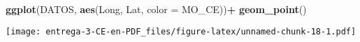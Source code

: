 \documentclass[
]{article}
\newenvironment{Shaded}{\begin{snugshade}}{\end{snugshade}}
\newcommand{\DataTypeTok}[1]{\textcolor[rgb]{0.13,0.29,0.53}{#1}}
\newcommand{\DecValTok}[1]{\textcolor[rgb]{0.00,0.00,0.81}{#1}}
\newcommand{\KeywordTok}[1]{\textcolor[rgb]{0.13,0.29,0.53}{\textbf{#1}}}
\newcommand{\NormalTok}[1]{#1}
\newcommand{\OperatorTok}[1]{\textcolor[rgb]{0.81,0.36,0.00}{\textbf{#1}}}
\newcommand{\StringTok}[1]{\textcolor[rgb]{0.31,0.60,0.02}{#1}}
\begin{document}
\begin{Shaded}
\begin{Highlighting}[]
\KeywordTok{ggplot}\NormalTok{(DATOS, }\KeywordTok{aes}\NormalTok{(Long, Lat, }\DataTypeTok{color =}\NormalTok{ MO_CE))}\OperatorTok{+}
\StringTok{  }\KeywordTok{geom_point}\NormalTok{()}
\end{Highlighting}
\end{Shaded}

\texttt{[image: entrega-3-CE-en-PDF\_files/figure-latex/unnamed-chunk-18-1.pdf]}

\begin{Shaded}
\end{Shaded}
\end{document}

